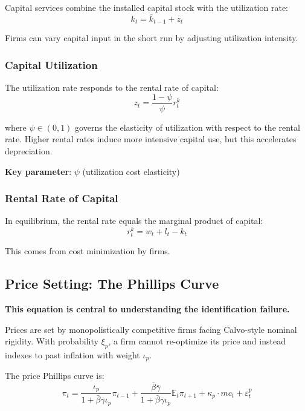 \documentclass[12pt]{article}
\begin{document}
Capital services combine the installed capital stock with the utilization rate:
\begin{equation}
\boxed{k_t = \bar{k}_{t-1} + z_t}
\label{eq:capitalservices}
\end{equation}

Firms can vary capital input in the short run by adjusting utilization intensity.

\subsubsection{Capital Utilization}

The utilization rate responds to the rental rate of capital:
\begin{equation}
\boxed{z_t = \frac{1-\psi}{\psi}r^k_t}
\label{eq:utilization}
\end{equation}

where $\psi \in (0,1)$ governs the elasticity of utilization with respect to the rental rate. Higher rental rates induce more intensive capital use, but this accelerates depreciation.

\textbf{Key parameter}: $\psi$ (utilization cost elasticity)

\subsubsection{Rental Rate of Capital}

In equilibrium, the rental rate equals the marginal product of capital:
\begin{equation}
\boxed{r^k_t = w_t + l_t - k_t}
\label{eq:rental}
\end{equation}

This comes from cost minimization by firms.

\subsection{Price Setting: The Phillips Curve}

\textbf{This equation is central to understanding the identification failure.}

Prices are set by monopolistically competitive firms facing Calvo-style nominal rigidity. With probability $\xi_p$, a firm cannot re-optimize its price and instead indexes to past inflation with weight $\iota_p$.

The price Phillips curve is:
\begin{equation}
\boxed{\pi_t = \frac{\iota_p}{1+\bar{\beta}\bar{\gamma}\iota_p}\pi_{t-1} + \frac{\bar{\beta}\bar{\gamma}}{1+\bar{\beta}\bar{\gamma}\iota_p}\mathbb{E}_t\pi_{t+1} + \kappa_p \cdot mc_t + \varepsilon^p_t}
\label{eq:phillips}
\end{equation}
\end{document}
